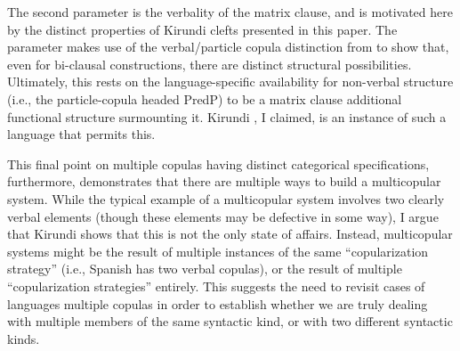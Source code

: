 \documentclass[12pt]{article}
\begin{document}
The second parameter is the verbality of the matrix clause, and is motivated here by the distinct properties of Kirundi clefts presented in this paper. The parameter makes use of the verbal/particle copula distinction from \citet{pustet-2003} to show that, even for bi-clausal constructions, there are distinct structural possibilities. Ultimately, this rests on the language-specific availability for non-verbal structure (i.e., the particle-copula headed PredP) to be a matrix clause  additional functional structure surmounting it. Kirundi , I claimed, is an instance of such a language that permits this.
 
This final point on multiple copulas having distinct categorical specifications, furthermore, demonstrates that there are multiple ways to build a multicopular system. While the typical example of a multicopular system involves two clearly verbal elements (though these elements may be defective in some way), I argue that Kirundi shows that this is not the only state of affairs. Instead, multicopular systems might be the result of multiple instances of the same ``copularization strategy'' (i.e., Spanish has two verbal copulas), or the result of multiple ``copularization strategies'' entirely. This suggests the need to revisit cases of languages multiple copulas in order to establish whether we are truly dealing with multiple members of the same syntactic kind, or with two different syntactic kinds. 

%
%
%
\end{document}
